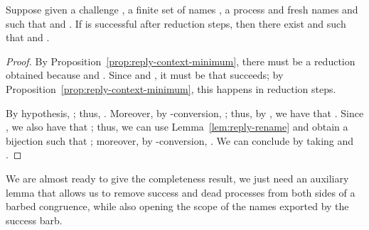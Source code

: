 \documentclass{LMCS}
\begin{document}
\begin{prop}
\label{thm:lts-2-succeed-reply}
Suppose given a challenge , a finite set of names , a process  and fresh names  and  such that  and .
If  is successful after  reduction steps,
then there exist  and  such that 
and .
\end{prop}
\begin{proof}
By Proposition~\ref{prop:reply-context-minimum},
there must be a reduction 
obtained because  and .
Since  and , it must be that
 succeeds; by 
Proposition~\ref{prop:reply-context-minimum}, this happens in  reduction steps.

By hypothesis, ; thus, .
Moreover, by -conversion, ;
thus, by , we have
that . Since ,
we also have that ; thus, we can
use Lemma~\ref{lem:reply-rename} and obtain a bijection  
such that ; moreover, by -conversion,
. We can conclude by taking  and
.
\end{proof}


We are almost ready to give the completeness result, we just need an auxiliary lemma that allows us to remove
success and dead processes from both sides of a barbed congruence, while also opening the scope of the names
exported by the success barb.
\end{document}
